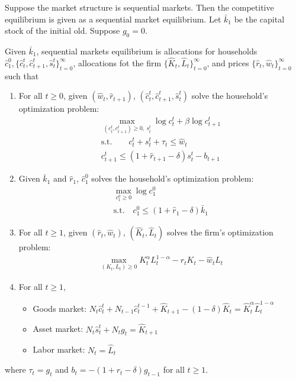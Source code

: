 \documentclass{ltjsarticle}
\begin{document}
Suppose the market structure is sequential markets. Then the competitive equilibrium is given as a sequential market equilibrium.
Let $\bar{k}_1$ be the capital stock of the initial old. Suppose $g_0 = 0$.

Given $\bar{k}_1$, sequential markets equilibrium is allocations for households $\hat{c}_1^0, \{\hat{c}_t^t, \hat{c}_{t+1}^t, \hat{s}_t^t \}_{t=0}^{\infty}$, allocations fot the firm $\{\hat{K}_t, \hat{L}_t\}_{t=0}^{\infty}$, and prices $\{\hat{r}_t, \hat{w}_t\}_{t=0}^{\infty}$ such that
\begin{enumerate}
  \item For all $t \geq 0$, given $(\hat{w}_t, \hat{r}_{t+1})$, $(\hat{c}_t^t, \hat{c}_{t+1}^t, \hat{s}_t^t)$ solve the household's optimization problem:
  \begin{gather*}
    \max_{(c_t^t, c_{t+1}^t) \geq 0, \: s_t^t} \log c_t^t + \beta \log c_{t+1}^t \\
    \text{s.t.} \qquad c_t^t + s_t^t + \tau_t \leq \hat{w}_t \\
    c_{t+1}^t \leq (1 + \hat{r}_{t+1} - \delta) s_t^t - b_{t+1}
  \end{gather*}
  \item Given $\bar{k}_1$ and $\hat{r}_1$, $\hat{c}_1^0$ solves the household's optimization problem:
  \begin{gather*}
    \max_{c_1^0 \geq 0} \log c_1^0 \\
    \text{s.t.} \quad c_1^0 \leq (1 + \hat{r}_1 - \delta) \bar{k}_1
  \end{gather*}
  \item For all $t \geq 1$, given $(\hat{r}_t, \hat{w}_t)$, $(\hat{K}_t, \hat{L}_t)$ solves the firm's optimization problem:
  \begin{gather*}
    \max_{(K_t, L_t) \geq 0} K_t^\alpha L_t^{1-\alpha} - \hat{r}_t K_t - \hat{w}_t L_t
  \end{gather*}
  \item For all $t \geq 1$,
  \begin{itemize}
    \item Goods market: $N_t \hat{c}_t^t + N_{t-1} \hat{c}_t^{t-1} + \hat{K}_{t+1} - (1-\delta) \hat{K}_t  = \hat{K}_t^\alpha \hat{L}_t^{1-\alpha}$
    \item Asset market: $N_t \hat{s}_t^t + N_t g_t = \hat{K}_{t+1}$
    \item Labor market: $N_t = \hat{L}_t$
  \end{itemize}
\end{enumerate}
where $\tau_t = g_t$ and $b_t = -(1 + r_t - \delta) g_{t-1}$ for all $t \geq 1$.
\end{document}
